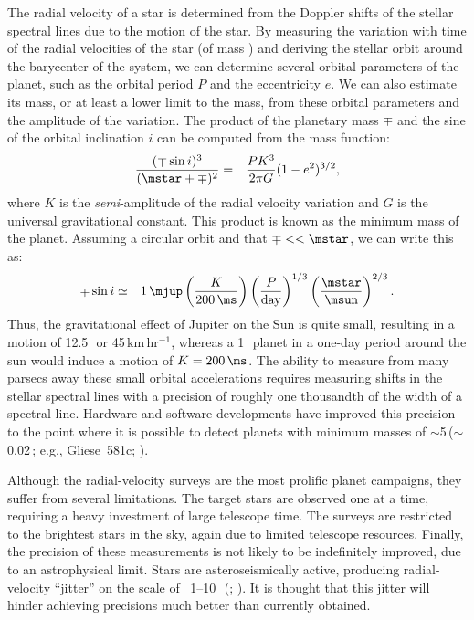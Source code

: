 The radial velocity of a star is determined from the Doppler shifts of the stellar spectral lines due to the motion of the star. 
By measuring the variation with time of the radial velocities of the star (of mass \mstar) and deriving the stellar orbit around the barycenter of the system, we can determine several orbital parameters of the planet, such as the orbital period $P$ 
and the eccentricity $e$.
We can also estimate its mass, or at least a lower limit to the mass, from these orbital parameters and the amplitude of the variation.
The product of the planetary mass $\mp$ and the sine of the orbital inclination $i$ can be computed from the mass function:
\begin{eqnarray*}
\frac{(\mp \sin{i})^3}{(\mstar + \mp)^2} & = 
& \frac{P K^3}{2 \pi G}  (1-e^2)^{3/2},
\end{eqnarray*}
where $K$ is the {\it semi}-amplitude of the radial velocity variation and $G$ is the universal gravitational constant.
This product is known as the minimum mass of the planet.
Assuming a circular orbit and that $\mp << \mstar$, we can write this as:
\begin{eqnarray}
\mp \sin{i} & \simeq & 1\,\mjup \left( \frac{K}{200\,\ms} \right)  
	\left( \frac{P}{\mathrm{day}} \right)^{1/3}  
	\left( \frac{\mstar}{\msun} \right)^{2/3}.\label{cha:intro:sec:methods:sub:rv:eqn:mpsini}
\end{eqnarray}
Thus, the gravitational effect of Jupiter on the Sun is quite small, resulting in a motion of 	12.5\,\ms\ or 45\,$\mathrm{km\,hr^{-1}}$, whereas a 1\,\mjup\ planet in a one-day period around the sun would induce a motion of $K=200\,\ms$. 
The ability to measure from many parsecs away these small orbital accelerations requires measuring shifts in the stellar spectral lines with a precision of roughly one thousandth of the width of a spectral line. 
Hardware and software developments have improved this precision to the point where it is possible to detect planets with minimum masses of $\sim$5\,\mearth ($\sim$0.02\,\mjup; e.g., \mbox{Gliese 581c}; \citealp{Udry_Bonfils_Delfosse:aa:2007a}). 

Although the radial-velocity surveys are the most prolific planet campaigns, they suffer from several limitations.
The target stars are observed one at a time, requiring a heavy investment of large telescope time.
The surveys are restricted to the brightest stars in the sky, again due to limited telescope resources.
Finally, the precision of these measurements is not likely to be indefinitely improved, due to an astrophysical limit.
Stars are asteroseismically active, producing radial-velocity ``jitter'' on the scale of ~1--10\,\ms\ (\citealp*{Saar_Butler_Marcy:apjl:1998a}; \citealp{Santos_Mayor_Naef:aa:2000a, Wright:pasp:2005a}). 
It is thought that this jitter will hinder achieving precisions much better than currently obtained. 

